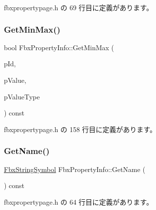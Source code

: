  fbxpropertypage.\+h の 69 行目に定義があります。

\mbox{\label{class_fbx_property_info_aa21fd9cc302856625f4a993a781b208f}} 
\subsubsection{\texorpdfstring{Get\+Min\+Max()}{GetMinMax()}}
{\footnotesize\ttfamily bool Fbx\+Property\+Info\+::\+Get\+Min\+Max (\begin{DoxyParamCaption}\item[{\hyperlink{class_fbx_property_info_a83069f079a29bde133f2e9324de5af43}{E\+Value\+Index}}]{p\+Id,  }\item[{void $\ast$}]{p\+Value,  }\item[{\hyperlink{fbxpropertytypes_8h_a73913a5ddfb20e57c6f25e9e6784bd92}{E\+Fbx\+Type}}]{p\+Value\+Type }\end{DoxyParamCaption}) const\hspace{0.3cm}{\ttfamily [inline]}}



 fbxpropertypage.\+h の 158 行目に定義があります。

\mbox{\label{class_fbx_property_info_af06f1b9f0f8505414e1cf85cc87cfb2a}} 
\subsubsection{\texorpdfstring{Get\+Name()}{GetName()}}
{\footnotesize\ttfamily \hyperlink{class_fbx_string_symbol}{Fbx\+String\+Symbol} Fbx\+Property\+Info\+::\+Get\+Name (\begin{DoxyParamCaption}{ }\end{DoxyParamCaption}) const\hspace{0.3cm}{\ttfamily [inline]}}



 fbxpropertypage.\+h の 64 行目に定義があります。

\mbox{\label{class_fbx_property_info_a1ca38d3986793f1a028a0bf84fe212c3}} 
